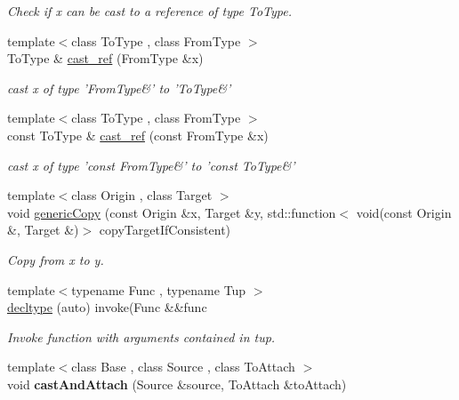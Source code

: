 \begin{DoxyCompactItemize}
\begin{DoxyCompactList}\small\item\em \-Check if x can be cast to a reference of type \-To\-Type. \end{DoxyCompactList}\item 
\hypertarget{namespaceSpacy_abb0550fc1d402f00e42c165ae8eb3305}{{\footnotesize template$<$class To\-Type , class From\-Type $>$ }\\\-To\-Type \& \hyperlink{namespaceSpacy_abb0550fc1d402f00e42c165ae8eb3305}{cast\-\_\-ref} (\-From\-Type \&x)}\label{namespaceSpacy_abb0550fc1d402f00e42c165ae8eb3305}

\begin{DoxyCompactList}\small\item\em cast x of type '\-From\-Type\&' to '\-To\-Type\&' \end{DoxyCompactList}\item 
\hypertarget{namespaceSpacy_a00fc9d674cd8813c4e20a05adf3aaaa4}{{\footnotesize template$<$class To\-Type , class From\-Type $>$ }\\const \-To\-Type \& \hyperlink{namespaceSpacy_a00fc9d674cd8813c4e20a05adf3aaaa4}{cast\-\_\-ref} (const \-From\-Type \&x)}\label{namespaceSpacy_a00fc9d674cd8813c4e20a05adf3aaaa4}

\begin{DoxyCompactList}\small\item\em cast x of type 'const \-From\-Type\&' to 'const \-To\-Type\&' \end{DoxyCompactList}\item 
{\footnotesize template$<$class Origin , class Target $>$ }\\void \hyperlink{namespaceSpacy_a7dd8ce352c45e326cf8966befd5159ce}{generic\-Copy} (const \-Origin \&x, \-Target \&y, std\-::function$<$ void(const \-Origin \&, \-Target \&)$>$ copy\-Target\-If\-Consistent)
\begin{DoxyCompactList}\small\item\em \-Copy from x to y. \end{DoxyCompactList}\item 
{\footnotesize template$<$typename Func , typename Tup $>$ }\\\hyperlink{namespaceSpacy_afbcee52cc294417930c5ccfc2fefb9f8}{decltype} (auto) invoke(\-Func \&\&func
\begin{DoxyCompactList}\small\item\em \-Invoke function with arguments contained in tup. \end{DoxyCompactList}\item 
\hypertarget{namespaceSpacy_accc9a8a0cad11b10fb4453e6bea7a7e1}{{\footnotesize template$<$class Base , class Source , class To\-Attach $>$ }\\void {\bfseries cast\-And\-Attach} (\-Source \&source, \-To\-Attach \&to\-Attach)}\label{namespaceSpacy_accc9a8a0cad11b10fb4453e6bea7a7e1}


\end{DoxyCompactItemize}

